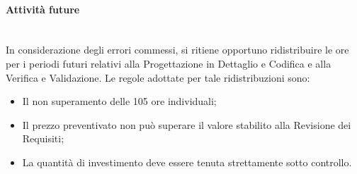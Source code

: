 \paragraph{Attività future}\mbox{}\\
In considerazione degli errori commessi, si ritiene opportuno ridistribuire le ore per i periodi futuri relativi alla Progettazione in Dettaglio e Codifica e alla Verifica e Validazione. Le regole adottate per tale ridistribuzioni sono:
\begin{itemize}
	\item Il non superamento delle 105 ore individuali;
	\item Il prezzo preventivato non può superare il valore stabilito alla Revisione dei Requisiti;
	\item La quantità di investimento deve essere tenuta strettamente sotto controllo.
\end{itemize}
%
